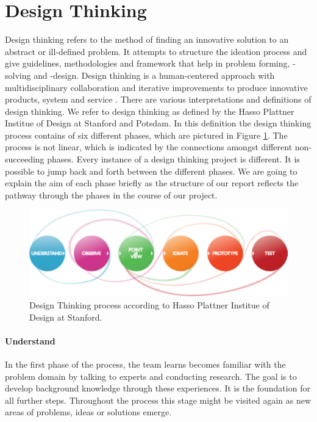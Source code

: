 
\section{Design Thinking}
\label{sec:DESIGN_THINKING}

Design thinking refers to the method of finding an innovative solution to an abstract or ill-defined problem. It attempts to structure the ideation process and give guidelines, methodologies and framework that help in problem forming, -solving and -design. Design thinking is a human-centered approach with multidisciplinary collaboration and iterative improvements to produce innovative products, system and service \cite{design_thinking_book}. There are various interpretations and definitions of design thinking. We refer to design thinking as defined by the Hasso Plattner Institue of Design at Stanford and Potsdam. In this definition the design thinking process contains of six different phases, which are pictured in Figure \ref{fig:design_thinking_process}. The process is not linear, which is indicated by the connections amongst different non-succeeding phases. Every instance of a design thinking project is different. It is possible to jump back and forth between the different phases. We are going to explain the aim of each phase briefly as the structure of our report reflects the pathway through the phases in the course of our project.

\begin{figure}
    \includegraphics[width=\linewidth]{images/design_thinking_process}
    \caption{Design Thinking process according to Hasso Plattner Institue of Design at Stanford.}
    \label{fig:design_thinking_process}
\end{figure}

\paragraph{Understand}
In the first phase of the process, the team learns becomes familiar with the problem domain by talking to experts and conducting research. The goal is to develop background knowledge through these experiences. It is the foundation for all further steps. Throughout the process this stage might be visited again as new areas of problems, ideas or solutions emerge.

